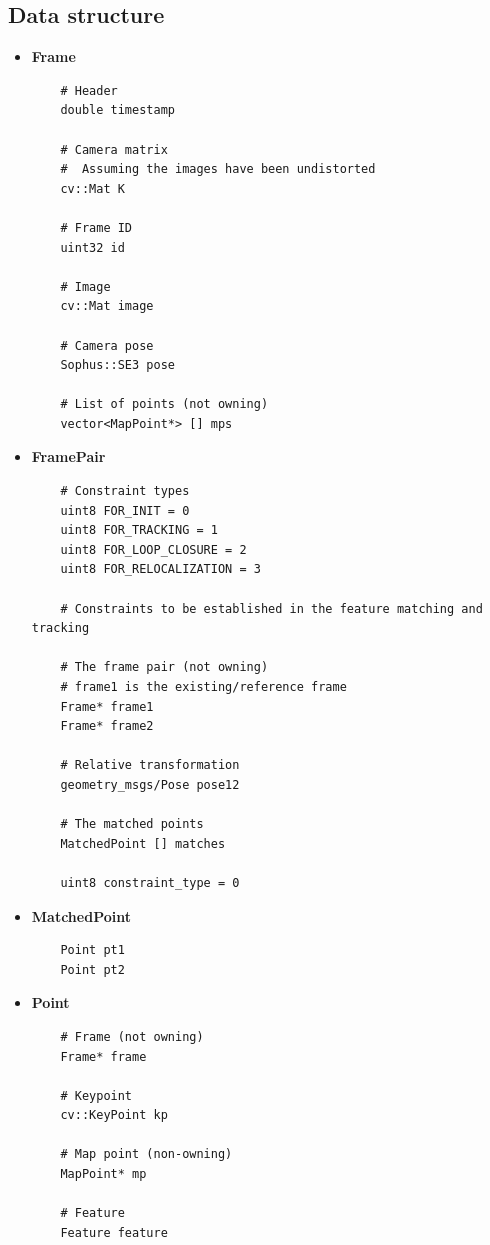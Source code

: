 \subsection{Data structure}

\begin{itemize}
  \item \textbf{Frame}
  \begin{verbatim}
    # Header
    double timestamp

    # Camera matrix
    #  Assuming the images have been undistorted
    cv::Mat K

    # Frame ID
    uint32 id 

    # Image
    cv::Mat image
    
    # Camera pose
    Sophus::SE3 pose
    
    # List of points (not owning)
    vector<MapPoint*> [] mps
  \end{verbatim}

  \item \textbf{FramePair}
  \begin{verbatim}
    # Constraint types
    uint8 FOR_INIT = 0
    uint8 FOR_TRACKING = 1
    uint8 FOR_LOOP_CLOSURE = 2
    uint8 FOR_RELOCALIZATION = 3

    # Constraints to be established in the feature matching and tracking 

    # The frame pair (not owning)
    # frame1 is the existing/reference frame
    Frame* frame1
    Frame* frame2

    # Relative transformation
    geometry_msgs/Pose pose12

    # The matched points
    MatchedPoint [] matches

    uint8 constraint_type = 0
  \end{verbatim}

  \item \textbf{MatchedPoint}
  \begin{verbatim}
    Point pt1    
    Point pt2
  \end{verbatim}

  \item \textbf{Point}
  \begin{verbatim}
    # Frame (not owning)
    Frame* frame
    
    # Keypoint
    cv::KeyPoint kp

    # Map point (non-owning)
    MapPoint* mp
    
    # Feature
    Feature feature    
  \end{verbatim}


\end{itemize}
